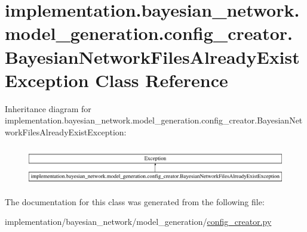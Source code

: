 \hypertarget{classimplementation_1_1bayesian__network_1_1model__generation_1_1config__creator_1_1_bayesian_neaa9550024351ca391a952f36bc1cef38}{}\section{implementation.\+bayesian\+\_\+network.\+model\+\_\+generation.\+config\+\_\+creator.\+Bayesian\+Network\+Files\+Already\+Exist\+Exception Class Reference}
\label{classimplementation_1_1bayesian__network_1_1model__generation_1_1config__creator_1_1_bayesian_neaa9550024351ca391a952f36bc1cef38}
Inheritance diagram for implementation.\+bayesian\+\_\+network.\+model\+\_\+generation.\+config\+\_\+creator.\+Bayesian\+Network\+Files\+Already\+Exist\+Exception\+:\begin{figure}[H]
\begin{center}
\leavevmode
\includegraphics[height=1.712538cm]{classimplementation_1_1bayesian__network_1_1model__generation_1_1config__creator_1_1_bayesian_neaa9550024351ca391a952f36bc1cef38}
\end{center}
\end{figure}


The documentation for this class was generated from the following file\+:\begin{DoxyCompactItemize}
\item 
implementation/bayesian\+\_\+network/model\+\_\+generation/\hyperlink{config__creator_8py}{config\+\_\+creator.\+py}\end{DoxyCompactItemize}
